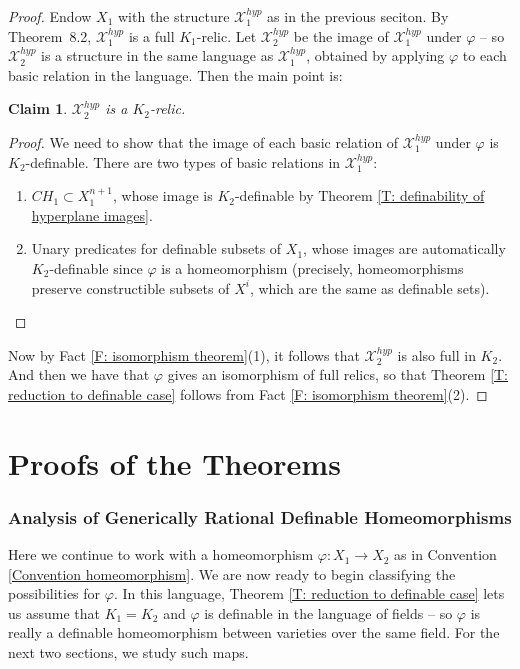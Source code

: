 \documentclass{amsart}
\newtheorem{claim}[theorem]{Claim}
\theoremstyle{definition}
\begin{document}
\begin{proof}
Endow $X_1$ with the structure $\mathcal{X}_1^{hyp}$ as in the previous seciton. By Theorem~8.2, $\mathcal X_1^{hyp}$ is a full $K_1$-relic. Let $\mathcal X_2^{hyp}$ be the image of $\mathcal X_1^{hyp}$ under $\varphi$ -- so $\mathcal X_2^{hyp}$ is a structure in the same language as $\mathcal X_1^{hyp}$, obtained by applying $\varphi$ to each basic relation in the language. Then the main point is:

\begin{claim}
    $\mathcal X_2^{hyp}$ is a $K_2$-relic.
\end{claim}
\begin{proof}
    We need to show that the image of each basic relation of $\mathcal X_1^{hyp}$ under $\varphi$ is $K_2$-definable. There are two types of basic relations in $\mathcal X_1^{hyp}$:
    \begin{enumerate}
        \item $CH_1\subset X_1^{n+1}$, whose image is $K_2$-definable by Theorem \ref{T: definability of hyperplane images}.
        \item Unary predicates for definable subsets of $X_1$, whose images are automatically $K_2$-definable since $\varphi$ is a homeomorphism (precisely, homeomorphisms preserve constructible subsets of $X^i$, which are the same as definable sets).
    \end{enumerate}
\end{proof}

Now by Fact \ref{F: isomorphism theorem}(1), it follows that $\mathcal X_2^{hyp}$ is also full in $K_2$. And then we have that $\varphi$ gives an isomorphism of full relics, so that Theorem \ref{T: reduction to definable case} follows from Fact \ref{F: isomorphism theorem}(2).
\end{proof}

\part{Proofs of the Theorems}

\section{Analysis of Generically Rational Definable Homeomorphisms}

Here we continue to work with a homeomorphism $\varphi:X_1\rightarrow X_2$ as in Convention \ref{Convention homeomorphism}. We are now ready to begin classifying the possibilities for $\varphi$. In this language, Theorem \ref{T: reduction to definable case} lets us assume that $K_1=K_2$ and $\varphi$ is definable in the language of fields -- so $\varphi$ is really a definable homeomorphism between varieties over the same field. For the next two sections, we study such maps.
\end{document}
